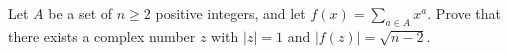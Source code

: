 Let $A$ be a set of $n\ge2$ positive integers, and let $\textstyle f(x)=\sum_{a\in A}x^a$. Prove that there exists a complex number $z$ with $\lvert z\rvert=1$ and $\lvert f(z)\rvert=\sqrt{n-2}$.